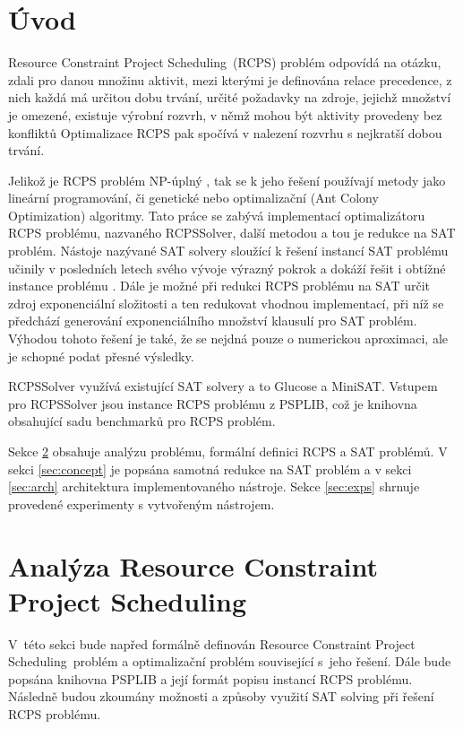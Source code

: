 \documentclass[a4paper, 12pt]{article}
\title{\rcps}
\author{Martin Hruška\\xhrusk16@stud.fit.vutbr.cz}
\date{}
\newcommand{\rcps}[0]{Resource Constraint Project Scheduling}
\begin{document}
\maketitle

\section{Úvod}
\label{sec:intro}
\rcps\ (RCPS) problém odpovídá na otázku, zdali pro danou množinu aktivit, mezi kterými je definována
relace precedence, z nich každá má určitou dobu trvání, určité požadavky na zdroje, jejichž množství je omezené,
existuje výrobní rozvrh, v němž mohou být aktivity provedeny bez konfliktů
Optimalizace RCPS pak spočívá v nalezení rozvrhu s nejkratší dobou trvání.

Jelikož je RCPS problém NP-úplný \cite{artigues:2007}, tak se k jeho řešení používají metody jako
lineární programování, či genetické nebo optimalizační (Ant Colony Optimization) algoritmy.
Tato práce se zabývá implementací optimalizátoru RCPS problému, nazvaného RCPSSolver,
další metodou a tou je redukce na SAT problém.
Nástoje nazývané SAT solvery sloužící k řešení instancí SAT problému učinily v posledních letech
svého vývoje výrazný pokrok a dokáží řešit i obtížné instance problému \cite{www:minisat,www:glucose}.
Dále je možné při redukci RCPS problému na SAT určit zdroj exponenciální složitosti a ten
redukovat vhodnou implementací, při níž se předchází generování exponenciálního množství klausulí pro SAT problém.
Výhodou tohoto řešení je také, že se nejdná pouze o numerickou aproximaci, ale je schopné podat přesné
výsledky.

RCPSSolver využívá existující SAT solvery a to Glucose a MiniSAT.
Vstupem pro RCPSSolver jsou instance RCPS problému z PSPLIB, což je knihovna obsahující sadu benchmarků
pro RCPS problém.

Sekce \ref{sec:analysis} obsahuje analýzu problému, formální definici RCPS a SAT problémů.
V sekci \ref{sec:concept} je popsána samotná redukce na SAT problém a v sekci \ref{sec:arch}
architektura implementovaného nástroje.
Sekce \ref{sec:exps} shrnuje provedené experimenty s vytvořeným nástrojem.

\section{Analýza \rcps}
\label{sec:analysis}
V~této sekci bude napřed formálně definován \rcps\ problém a optimalizační problém související s~jeho řešení.
Dále bude popsána knihovna PSPLIB a její formát popisu instancí RCPS problému.
Následně budou zkoumány možnosti a způsoby využití SAT solving při řešení RCPS problému.
\end{document}

